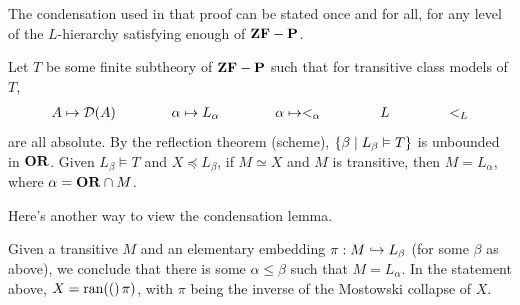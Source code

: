 The condensation used in that proof can be stated once and for all, for any level of the $L$-hierarchy satisfying enough of $\mathbf{ZF} - \mathbf{P}$.

\begin{boxlemma}
    Let $T$ be some finite subtheory of $\mathbf{ZF} - \mathbf{P}$ such that for transitive class models of $T$,
    \begin{align*}
        A \mapsto \mathcal{D}(A)
        \qquad \qquad
        \alpha \mapsto L_{\alpha}
        \qquad \qquad
        \alpha \mapsto <_{\alpha}
        \qquad \qquad
        L
        \qquad \qquad
        <_L
    \end{align*}
    are all absolute. By the reflection theorem (scheme), $\left\{ \beta \; \middle\vert \; L_{\beta} \vDash T \right\}$ is unbounded in $\mathbf{OR}$. Given $L_{\beta} \models T$ and $X \preceq L_{\beta}$, if $M \simeq X$ and $M$ is transitive, then $M = L_{\alpha}$, where $\alpha = \mathbf{OR} \cap M$.
\end{boxlemma}

Here's another way to view the condensation lemma.

Given a transitive $M$ and an elementary embedding $\pi : M \hookrightarrow L_{\beta}$ (for some $\beta$ as above), we conclude that there is some $\alpha \leq \beta$ such that $M = L_{\alpha}$. In the statement above, $X = \operatorname{ran}\!\left( ( \right)\pi)$, with $\pi$ being the inverse of the Mostowski collapse of $X$.
